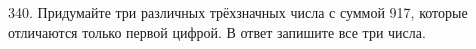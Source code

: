 340. Придумайте три различных трёхзначных числа с суммой 917, которые отличаются только первой цифрой. В ответ запишите все три числа.\\

